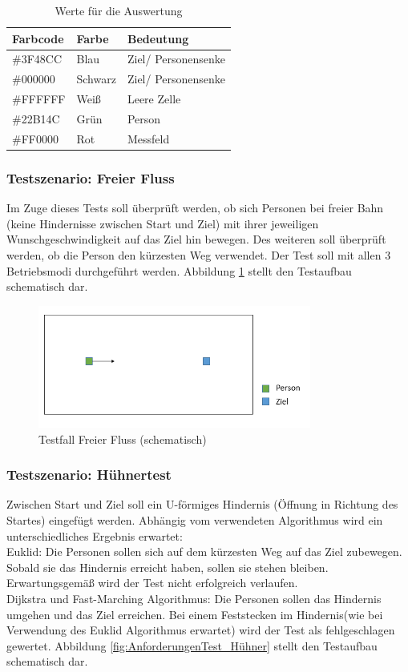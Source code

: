 \begin{table}[htpb]
	\centering
	\begin{tabular}{lll}
		Farbcode & Farbe & Bedeutung\\ \hline
		\#3F48CC & Blau & Ziel/ Personensenke \\	
		\#000000 & Schwarz & Ziel/ Personensenke \\
		\#FFFFFF & Weiß & Leere Zelle \\
		\#22B14C & Grün & Person \\
		\#FF0000 & Rot  & Messfeld
	\end{tabular}
	\caption{Werte für die Auswertung}
	\label{tab:Farbcodes}
\end{table}
 
\subsubsection{Testszenario: Freier Fluss}
Im Zuge dieses Tests soll überprüft werden, ob sich Personen bei freier Bahn (keine Hindernisse zwischen Start und Ziel) mit ihrer jeweiligen Wunschgeschwindigkeit auf das Ziel hin bewegen. Des weiteren soll überprüft werden, ob die Person den kürzesten Weg verwendet. Der Test soll mit allen 3 Betriebsmodi durchgeführt werden. Abbildung \ref{fig:AnforderungenTest_FreierFluss} stellt den Testaufbau schematisch dar.

\begin{figure}[htpb]
	\centering
	\includegraphics[width=0.8\textwidth]{abbildungen/Test_FreierFluss.png}
	\caption{Testfall Freier Fluss (schematisch)}
	\label{fig:AnforderungenTest_FreierFluss}
\end{figure}

\subsubsection{Testszenario: Hühnertest}
Zwischen Start und Ziel soll ein U-förmiges Hindernis (Öffnung in Richtung des Startes) eingefügt werden. Abhängig vom verwendeten Algorithmus wird ein unterschiedliches Ergebnis erwartet:\\
Euklid: Die Personen sollen sich auf dem kürzesten Weg auf das Ziel zubewegen. Sobald sie das Hindernis erreicht haben, sollen sie stehen bleiben. Erwartungsgemäß wird der Test nicht erfolgreich verlaufen. \\
Dijkstra und Fast-Marching Algorithmus: Die Personen sollen das Hindernis umgehen und das Ziel erreichen. Bei einem \glqq Feststecken im Hindernis\grqq (wie bei Verwendung des Euklid Algorithmus erwartet) wird der Test als fehlgeschlagen gewertet. Abbildung \ref{fig:AnforderungenTest_Hühner} stellt den Testaufbau schematisch dar.

